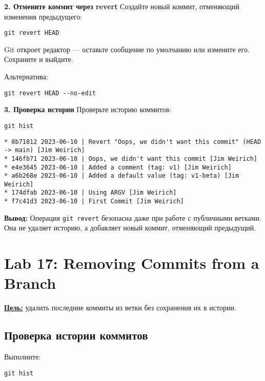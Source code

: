 \documentclass[a4paper,12pt]{report}
\begin{document}
\textbf{2. Отмените коммит через revert}
Создайте новый коммит, отменяющий изменения предыдущего:
\begin{verbatim}
git revert HEAD
\end{verbatim}

Git откроет редактор — оставьте сообщение по умолчанию или измените его. Сохраните и выйдите.

Альтернатива:
\begin{verbatim}
git revert HEAD --no-edit
\end{verbatim}


\textbf{3. Проверка истории}
Проверьте историю коммитов:
\begin{verbatim}
git hist
\end{verbatim}

\begin{verbatim}
* 8b71812 2023-06-10 | Revert "Oops, we didn't want this commit" (HEAD -> main) [Jim Weirich]
* 146fb71 2023-06-10 | Oops, we didn't want this commit [Jim Weirich]
* e4e3645 2023-06-10 | Added a comment (tag: v1) [Jim Weirich]
* a6b268e 2023-06-10 | Added a default value (tag: v1-beta) [Jim Weirich]
* 174dfab 2023-06-10 | Using ARGV [Jim Weirich]
* f7c41d3 2023-06-10 | First Commit [Jim Weirich]
\end{verbatim}


\textbf{Вывод:} 
Операция \texttt{git revert} безопасна даже при работе с публичными ветками. Она не удаляет историю, а добавляет новый коммит, отменяющий предыдущий.

\section{Lab 17: Removing Commits from a Branch}
\textbf{\underline{Цель:}} удалить последние коммиты из ветки без сохранения их в истории.

\subsection*{Проверка истории коммитов}
Выполните:
\begin{verbatim}
git hist
\end{verbatim}
\end{document}
